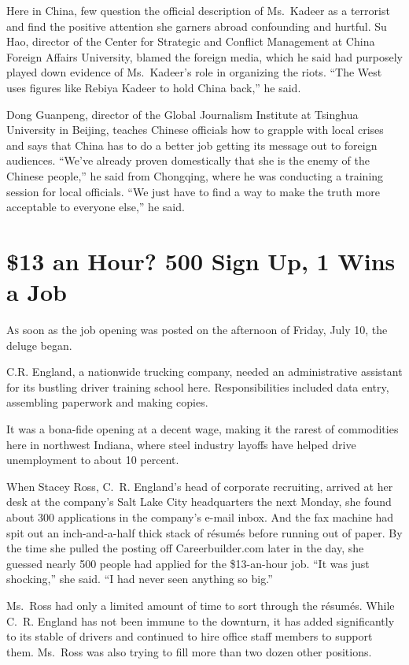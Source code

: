 ﻿\documentclass[12pt]{article}
\begin{document}
Here in China, few question the official description of Ms.~Kadeer as a terrorist and find the
positive attention she garners abroad confounding and hurtful. Su Hao, director of the Center for
Strategic and Conflict Management at China Foreign Affairs University, blamed the foreign media,
which he said had purposely played down evidence of Ms.~Kadeer's role in organizing the riots. ``The
West uses figures like Rebiya Kadeer to hold China back,'' he said.

Dong Guanpeng, director of the Global Journalism Institute at Tsinghua University in Beijing,
teaches Chinese officials how to grapple with local crises and says that China has to do a better
job getting its message out to foreign audiences. ``We've already proven domestically that she is
the enemy of the Chinese people,'' he said from Chongqing, where he was conducting a training
session for local officials. ``We just have to find a way to make the truth more acceptable to
everyone else,'' he said.

\section{\$13 an Hour? 500 Sign Up, 1 Wins a Job}

\lettrine{A}{s} soon as the job opening was posted on the afternoon of
Friday, July 10, the deluge\cite{deluge} began.

C.R. England, a nationwide trucking company, needed an administrative assistant for its bustling
driver training school here. Responsibilities included data entry, assembling paperwork and making
copies.

It was a bona-fide opening at a decent wage, making it the rarest of commodities here in northwest
Indiana, where steel industry layoffs have helped drive unemployment to about 10 percent.

When Stacey Ross, C.~R. England's head of corporate recruiting, arrived at her desk at the company's
Salt Lake City headquarters the next Monday, she found about 300 applications in the company's
e-mail inbox. And the fax machine had spit out an inch-and-a-half thick stack of r\'esum\'es before
running out of paper. By the time she pulled the posting off Careerbuilder.com later in the day, she
guessed nearly 500 people had applied for the \$13-an-hour job. ``It was just shocking,'' she said.
``I had never seen anything so big.''

Ms.~Ross had only a limited amount of time to sort through the r\'esum\'es. While C.~R. England has
not been immune to the downturn, it has added significantly to its stable of drivers and continued
to hire office staff members to support them. Ms.~Ross was also trying to fill more than two dozen
other positions.
\end{document}
